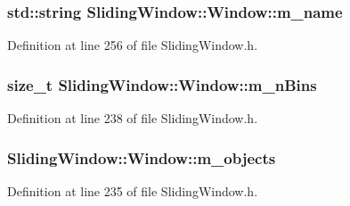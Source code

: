\subsubsection[{\texorpdfstring{m\+\_\+name}{m_name}}]{\setlength{\rightskip}{0pt plus 5cm}std\+::string Sliding\+Window\+::\+Window\+::m\+\_\+name\hspace{0.3cm}{\ttfamily [protected]}}\hypertarget{classSlidingWindow_1_1Window_a91d8a34cff48db9b83909c8d3ea8320a}{}\label{classSlidingWindow_1_1Window_a91d8a34cff48db9b83909c8d3ea8320a}


Definition at line 256 of file Sliding\+Window.\+h.

\subsubsection[{\texorpdfstring{m\+\_\+n\+Bins}{m_nBins}}]{\setlength{\rightskip}{0pt plus 5cm}size\+\_\+t Sliding\+Window\+::\+Window\+::m\+\_\+n\+Bins\hspace{0.3cm}{\ttfamily [protected]}}\hypertarget{classSlidingWindow_1_1Window_a3766b935d338405d7e475770233fcea3}{}\label{classSlidingWindow_1_1Window_a3766b935d338405d7e475770233fcea3}


Definition at line 238 of file Sliding\+Window.\+h.

\subsubsection[{\texorpdfstring{m\+\_\+objects}{m_objects}}]{ Sliding\+Window\+::\+Window\+::m\+\_\+objects\hspace{0.3cm}{\ttfamily [protected]}}\hypertarget{classSlidingWindow_1_1Window_a05a54515c6d4c39b28f524d6cb491cec}{}\label{classSlidingWindow_1_1Window_a05a54515c6d4c39b28f524d6cb491cec}


Definition at line 235 of file Sliding\+Window.\+h.

